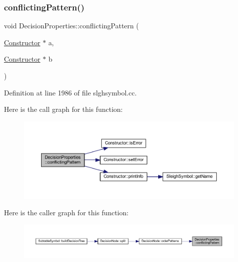 \subsubsection{\texorpdfstring{conflictingPattern()}{conflictingPattern()}}
{\footnotesize\ttfamily void Decision\+Properties\+::conflicting\+Pattern (\begin{DoxyParamCaption}\item[{\mbox{\hyperlink{class_constructor}{Constructor}} $\ast$}]{a,  }\item[{\mbox{\hyperlink{class_constructor}{Constructor}} $\ast$}]{b }\end{DoxyParamCaption})}



Definition at line 1986 of file slghsymbol.\+cc.

Here is the call graph for this function\+:
\nopagebreak
\begin{figure}[H]
\begin{center}
\leavevmode
\includegraphics[width=350pt]{class_decision_properties_a05d2791850a7f0fe83725064a2ef027b_cgraph}
\end{center}
\end{figure}
Here is the caller graph for this function\+:
\nopagebreak
\begin{figure}[H]
\begin{center}
\leavevmode
\includegraphics[width=350pt]{class_decision_properties_a05d2791850a7f0fe83725064a2ef027b_icgraph}
\end{center}
\end{figure}
\mbox{\label{class_decision_properties_a793e7507cdef2823782b51e2ff00e89d}} 
